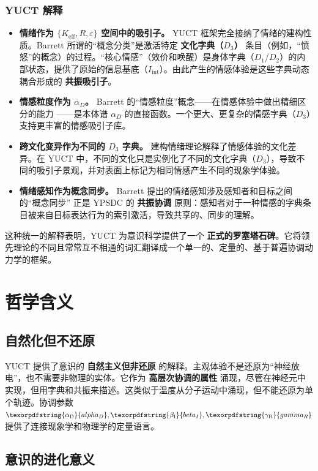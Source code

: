 \documentclass[12pt,a4paper]{article}
\DeclareRobustCommand{\alD}{\texorpdfstring{\ensuremath{\alpha_{\mathrm{D}}}}{alpha_D}}
\DeclareRobustCommand{\beI}{\texorpdfstring{\ensuremath{\beta_{\mathrm{I}}}}{beta_I}}
\DeclareRobustCommand{\gaR}{\texorpdfstring{\ensuremath{\gamma_{\mathrm{R}}}}{gamma_R}}
\begin{document}
	\subsubsection*{YUCT 解释}
	\begin{itemize}
		\item \textbf{情绪作为 $\{K_{\mathrm{eff}}, R, \varepsilon\}$ 空间中的吸引子。} YUCT 框架完全接纳了情绪的建构性质。Barrett 所谓的“概念分类”是激活特定 \textbf{文化字典（$D_3$）} 条目（例如，“愤怒”的概念）的过程。“核心情感”（效价和唤醒）是身体字典（$D_1$/$D_2$）的内部状态，提供了原始的信息基底（$I_{\mathrm{int}}$）。由此产生的情感体验是这些字典动态耦合形成的 \textbf{共振吸引子}。
		\item \textbf{情感粒度作为 $\alpha_D$。} Barrett 的“情感粒度”概念——在情感体验中做出精细区分的能力 \cite{Barrett2025}——是本体谱 $\alpha_D$ 的直接函数。一个更大、更复杂的情感字典（$D_3$）支持更丰富的情感吸引子库。
		\item \textbf{跨文化变异作为不同的 $D_3$ 字典。} 建构情绪理论解释了情感体验的文化差异。在 YUCT 中，不同的文化只是实例化了不同的文化字典（$D_3$），导致不同的吸引子景观，并对表面上标记为相同情感产生不同的现象学体验。
		\item \textbf{情绪感知作为概念同步。} Barrett 提出的情绪感知涉及感知者和目标之间的“概念同步” \cite{Gendron2018} 正是 YPSDC 的 \textbf{共振协调} 原则：感知者对于一种情感的字典条目被来自目标表达行为的索引激活，导致共享的、同步的理解。
	\end{itemize}
	
	这种统一的解释表明，YUCT 为意识科学提供了一个 \textbf{正式的罗塞塔石碑}。它将领先理论的不同且常常互不相通的词汇翻译成一个单一的、定量的、基于普遍协调动力学的框架。
	
	\section{哲学含义}
	
	\subsection{自然化但不还原}
	
	YUCT 提供了意识的 \textbf{自然主义但非还原} 的解释。主观体验不是还原为“神经放电”，也不需要非物理的实体。它作为 \textbf{高层次协调的属性} 涌现，尽管在神经元中实现，但用字典和共振来描述。这类似于温度从分子运动中涌现，但不能还原为单个轨迹。协调参数 $\alD, \beI, \gaR$ 提供了连接现象学和物理学的定量语言。
	
	\subsection{意识的进化意义}
	
\end{document}
